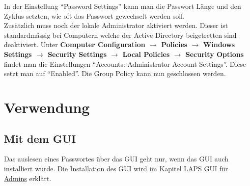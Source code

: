 In der Einstellung ``Password Settings'' kann man die Passwort Länge und den Zyklus setzten, wie oft das Passwort gewechselt werden soll.\\

Zusätzlich muss noch der lokale Administrator aktiviert werden.
Dieser ist standardmässig bei Computern welche der Active Directory beigetretten sind deaktiviert.
Unter \textbf{Computer Configuration $\rightarrow$ Policies $\rightarrow$ Windows Settings $\rightarrow$ Security Settings $\rightarrow$ Local Policies $\rightarrow$ Security Options } findet man die Einstellungen ``Accounts: Administrator Account Settings''.
Diese setzt man auf ``Enabled''.
Die Group Policy kann nun geschlossen werden.


\section{Verwendung}
\subsection{Mit dem GUI}\label{subsec:laps-gui-usage}
Das auslesen eines Passwortes über das GUI geht nur, wenn das GUI auch installiert wurde.
Die Installation des GUI wird im Kapitel \hyperref[subsubsec:Laps-Gui]{LAPS GUI für Admins} erklärt.\\

